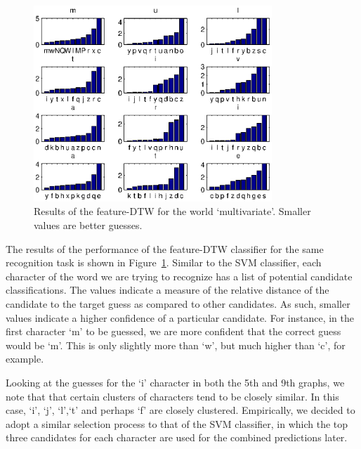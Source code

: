 \documentclass[12pt]{article}
\begin{document}
	\begin{figure}[htbp!]
	\centering
	\includegraphics[width=0.8\textwidth]{dtw_result.eps}
	\caption{Results of the feature-DTW for the world `multivariate'. Smaller values are better guesses.}
	\label{figure:dtw_result}
	\end{figure}
	
	The results of the performance of the feature-DTW classifier for the same recognition task is shown in Figure~\ref{figure:dtw_result}. Similar to the SVM classifier, each character of the word we are trying to recognize has a list of potential candidate classifications. The values indicate a measure of the relative distance of the candidate to the target guess as compared to other candidates. As such, smaller values indicate a higher confidence of a particular candidate. For instance, in the first character `m' to be guessed, we are more confident that the correct guess would be `m'. This is only slightly more than `w', but much higher than `c', for example. 
	
	Looking at the guesses for the `i' character in both the 5th and 9th graphs, we note that that certain clusters of characters tend to be closely similar. In this case, `i', `j', `l',`t' and perhaps `f' are closely clustered. Empirically, we decided to adopt a similar selection process to that of the SVM classifier, in which the top three candidates for each character are used for the combined predictions later.
	
\end{document}
